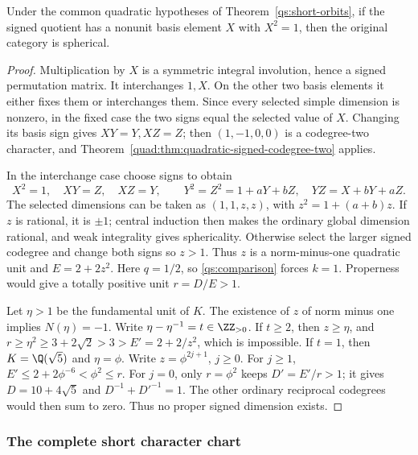 \begin{lemma}\label{qs:signed-involution}
Under the common quadratic hypotheses of Theorem~\ref{qs:short-orbits},
if the signed quotient has a nonunit basis element $X$ with $X^2=1$,
then the original category is spherical.
\end{lemma}
\begin{proof}
Multiplication by $X$ is a symmetric integral involution, hence a signed
permutation matrix. It interchanges $1,X$. On the other two basis
elements it either fixes them or interchanges them. Since every selected
simple dimension is nonzero, in the fixed case the two signs equal the
selected value of $X$. Changing its basis sign gives $XY=Y,XZ=Z$;
then $(1,-1,0,0)$ is a codegree-two character, and
Theorem~\ref{quad:thm:quadratic-signed-codegree-two} applies.

In the interchange case choose signs to obtain
\[
 X^2=1,\quad XY=Z,\quad XZ=Y,\qquad
 Y^2=Z^2=1+aY+bZ,\quad YZ=X+bY+aZ.
\]
The selected dimensions can be taken as $(1,1,z,z)$, with
$z^2=1+(a+b)z$. If $z$ is rational, it is $\pm1$; central induction
then makes the ordinary global dimension rational, and weak integrality
gives sphericality. Otherwise select the larger signed codegree and
change both signs so $z>1$. Thus $z$ is a norm-minus-one quadratic
unit and $E=2+2z^2$. Here $q=1/2$, so \eqref{qs:comparison} forces
$k=1$. Properness would give a totally positive unit $r=D/E>1$.

Let $\eta>1$ be the fundamental unit of $K$. The existence of $z$
of norm minus one implies $N(\eta)=-1$. Write
$\eta-\eta^{-1}=t\in\ZZ_{>0}$. If $t\ge2$, then $z\ge\eta$, and
$r\ge\eta^2\ge3+2\sqrt2>3>E'=2+2/z^2$, which is impossible.
If $t=1$, then $K=\Q(\sqrt5)$ and $\eta=\phi$.
Write $z=\phi^{2j+1}$, $j\ge0$. For $j\ge1$,
$E'\le2+2\phi^{-6}<\phi^2\le r$. For $j=0$, only
$r=\phi^2$ keeps $D'=E'/r>1$; it gives $D=10+4\sqrt5$ and
$D^{-1}+D'^{-1}=1$. The other ordinary reciprocal codegrees would
then sum to zero. Thus no proper signed dimension exists.
\end{proof}

\subsubsection{The complete short character chart}

